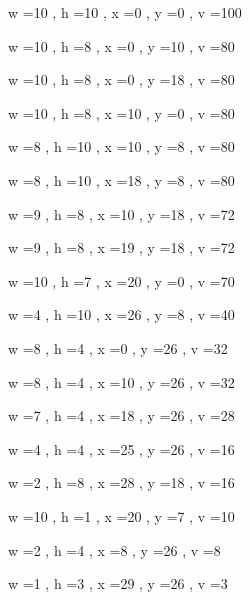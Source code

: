 \documentclass[11pt]{article}
\begin{document}
w =10 , h =10 , x =0 , y =0 , v =100
\par
w =10 , h =8 , x =0 , y =10 , v =80
\par
w =10 , h =8 , x =0 , y =18 , v =80
\par
w =10 , h =8 , x =10 , y =0 , v =80
\par
w =8 , h =10 , x =10 , y =8 , v =80
\par
w =8 , h =10 , x =18 , y =8 , v =80
\par
w =9 , h =8 , x =10 , y =18 , v =72
\par
w =9 , h =8 , x =19 , y =18 , v =72
\par
w =10 , h =7 , x =20 , y =0 , v =70
\par
w =4 , h =10 , x =26 , y =8 , v =40
\par
w =8 , h =4 , x =0 , y =26 , v =32
\par
w =8 , h =4 , x =10 , y =26 , v =32
\par
w =7 , h =4 , x =18 , y =26 , v =28
\par
w =4 , h =4 , x =25 , y =26 , v =16
\par
w =2 , h =8 , x =28 , y =18 , v =16
\par
w =10 , h =1 , x =20 , y =7 , v =10
\par
w =2 , h =4 , x =8 , y =26 , v =8
\par
w =1 , h =3 , x =29 , y =26 , v =3
\par
\newpage


\end{document}
